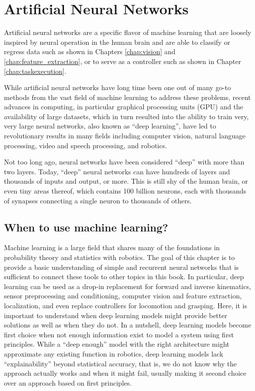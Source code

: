 \chapter{Artificial Neural Networks}\label{chap:ann}
Artificial neural networks are a specific flavor of machine learning that are loosely inspired by neural operation in the human brain and are able to classify or regress data such as shown in Chapters \ref{chap:vision} and \ref{chap:feature_extraction}, or to serve as a controller such as shown in Chapter \ref{chap:taskexecution}.

While artificial neural networks have long time been one out of many go-to methods from the vast field of machine learning to address these problems, recent advances in computing, in particular graphical processing units (GPU) and the availability of large datasets, which in turn resulted into the ability to train very, very large neural networks, also known as ``deep learning'', have led to revolutionary results in many fields including computer vision, natural language processing, video and speech processing, and robotics.

Not too long ago, neural networks have been considered ``deep'' with more than two layers. Today, ``deep'' neural networks can have hundreds of layers and thousands of inputs and output, or more. This is still shy of the human brain, or even tiny areas thereof, which contains 100 billion neurons, each with thousands of synapses connecting a single neuron to thousands of others.

\section{When to use machine learning?}
Machine learning is a large field that shares many of the foundations in probability theory and statistics with robotics. The goal of this chapter is to provide a basic understanding of simple and recurrent neural networks that is sufficient to connect these tools to other topics in this book. In particular, deep learning can be used as a drop-in replacement for forward and inverse kinematics, sensor preprocessing and conditioning, computer vision and feature extraction, localization, and even replace controllers for locomotion and grasping. Here, it is important to understand when deep learning models might provide better solutions as well as when they do not. In a nutshell, deep learning models become first choice when not enough information exist to model a system using first principles. While a ``deep enough'' model with the right architecture might approximate any existing function in robotics, deep learning models lack ``explainability'' beyond statistical accuracy, that is, we do not know why the approach actually works and when it might fail, usually making it second choice over an approach based on first principles.


